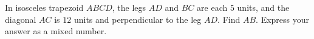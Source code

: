 In isosceles trapezoid $ABCD$, the legs $AD$ and $BC$ are each $5$ units, and the diagonal $AC$ is $12$ units and perpendicular to the leg $AD$. Find $AB$. Express your answer as a mixed number.
